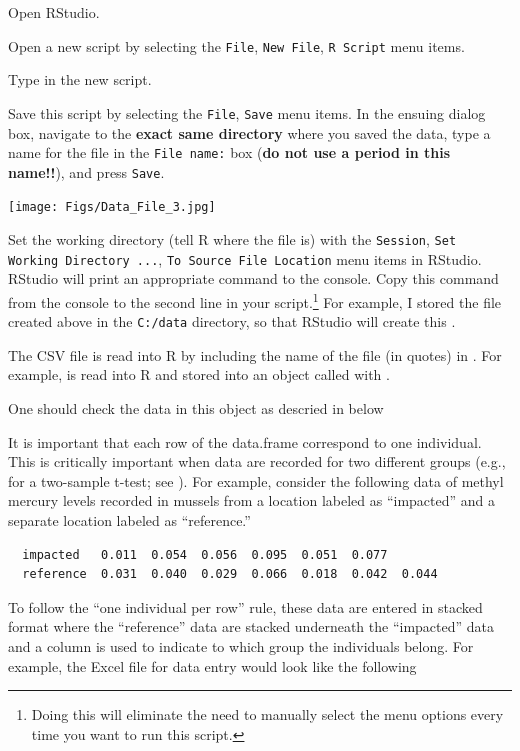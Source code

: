 \documentclass[10pt,openany]{book}\usepackage[]{graphicx}\usepackage[]{color}
\begin{document}
\begin{Itemize}
  \item Open RStudio.
  \item Open a new script by selecting the \verb"File", \verb"New File", \verb"R Script" menu items.
  \item Type  in the new script.
  \item Save this script by selecting the \verb"File", \verb"Save" menu items.  In the ensuing dialog box, navigate to the \textbf{exact same directory} where you saved the data, type a name for the file in the \verb"File name:" box (\textbf{do not use a period in this name!!}), and press \verb"Save".

\begin{center}
  \texttt{[image: Figs/Data\_File\_3.jpg]}
\end{center}

  \item Set the working directory (tell R where the file is) with the \verb"Session", \verb"Set Working Directory ...", \verb"To Source File Location" menu items in RStudio.  RStudio will print an appropriate  command to the console.  Copy this command from the console to the second line in your script.\footnote{Doing this will eliminate the need to manually select the menu options every time you want to run this script.}  For example, I stored the file created above in the \verb"C:/data" directory, so that RStudio will create this .
  \item The CSV file is read into R by including the name of the file (in quotes) in .  For example,  is read into R and stored into an object called  with .


  \item One should check the data in this object as descried in  below
\end{Itemize}


It is important that each row of the data.frame correspond to one individual.  This is critically important when data are recorded for two different groups (e.g., for a two-sample t-test; see ).  For example, consider the following data of methyl mercury levels recorded in mussels from a location labeled as ``impacted'' and a separate location labeled as ``reference.''
\begin{Verbatim}
  impacted   0.011  0.054  0.056  0.095  0.051  0.077
  reference  0.031  0.040  0.029  0.066  0.018  0.042  0.044
\end{Verbatim}
To follow the ``one individual per row'' rule, these data are entered in stacked format where the ``reference'' data are stacked underneath the ``impacted'' data and a column is used to indicate to which group the individuals belong.  For example, the Excel file for data entry would look like the following
\end{document}

